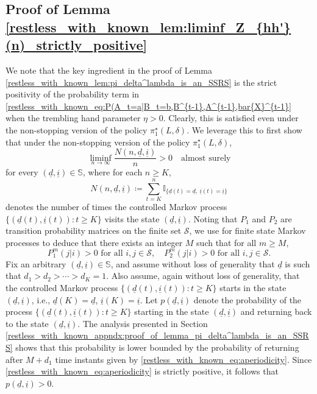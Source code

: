 \subsection{Proof of Lemma \ref{restless_with_known_lem:liminf_Z_{hh'}(n)_strictly_positive}}\label{restless_with_known_appndx:proof_of_lem_liminf_Z_{hh'}(n)_strictly_positive}
We note that the key ingredient in the proof of Lemma \ref{restless_with_known_lem:pi_delta^lambda_is_an_SSRS} is  the strict positivity of the probability term in \eqref{restless_with_known_eq:P(A_t=a|B_t=b,B^{t-1},A^{t-1},bar{X}^{t-1}} when the trembling hand parameter $\eta>0$. Clearly, this is satisfied even under the non-stopping version of the policy $\pi_1^\star(L,\delta)$. We leverage this to first show that under the non-stopping version of the policy $\pi_1^\star(L, \delta)$,
\begin{equation}
	\liminf\limits_{n\to\infty}\frac{N(n,\underline{d},\underline{i})}{n}>0\quad \text{almost surely}\label{restless_with_known_eq:lim_N(n,d,i)}
\end{equation}
for every $(\underline{d},\underline{i})\in\mathbb{S}$, where for each $n\geq K$,
\begin{equation}
	N(n,\underline{d},\underline{i})\coloneqq \sum\limits_{t=K}^{n}\mathbb{I}_{\{\underline{d}(t)=\underline{d},~\underline{i}(t)=\underline{i}\}}\label{restless_with_known_eq:N(n,d,i)}
\end{equation}
denotes the number of times the controlled Markov process $\{(\underline{d}(t),\underline{i}(t)):t\geq K\}$ visits the state $(\underline{d},\underline{i})$. Noting that $P_1$ and $P_2$ are transition probability matrices on the finite set $\mathcal{S}$, we use \cite[Proposition 1.7]{levin2017markov} for finite state Markov processes to deduce that there exists an integer $M$ such that for all $m\geq M$,
\begin{equation}
P_1^m(j|i)>0\text{ for all }i,j\in\mathcal{S},\quad P_2^m(j|i)>0\text{ for all }i,j\in\mathcal{S}.
\end{equation}
Fix an arbitrary $(\underline{d}, \underline{i})\in\mathbb{S}$, and assume without loss of generality that $\underline{d}$ is such that $d_1>d_2>\cdots>d_K=1$. Also assume, again without loss of generality, that the controlled Markov process $\{(\underline{d}(t), \underline{i}(t)):t\geq K\}$ starts in the state $(\underline{d}, \underline{i})$, i.e., $\underline{d}(K)=\underline{d}$, $\underline{i}(K)=\underline{i}$. Let $p(\underline{d}, \underline{i})$ denote the probability of the process  $\{(\underline{d}(t),\underline{i}(t)):t\geq K\}$ starting in the state $(\underline{d},\underline{i})$ and returning back to the state $(\underline{d},\underline{i})$. The analysis presented in Section \ref{restless_with_known_appndx:proof_of_lemma_pi_delta^lambda_is_an_SSRS} shows that this probability is lower bounded by the probability of returning after $M+d_1$ time instants given by \eqref{restless_with_known_eq:aperiodicity}. Since \eqref{restless_with_known_eq:aperiodicity} is strictly positive, it follows that $p(\underline{d},\underline{i})>0$. 

